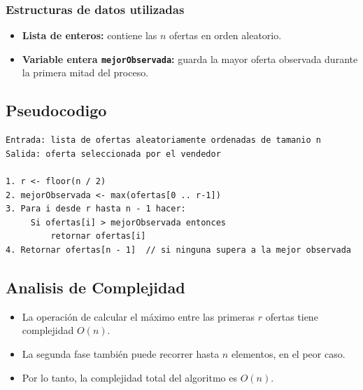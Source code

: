 \documentclass[a4paper, 12pt]{article}
\begin{document}
\subsubsection*{Estructuras de datos utilizadas}
\begin{itemize}
    \item \textbf{Lista de enteros:} contiene las $n$ ofertas en orden aleatorio.
    \item \textbf{Variable entera \texttt{mejorObservada}:} guarda la mayor oferta observada durante la primera mitad del proceso.
\end{itemize}

\subsection{Pseudocodigo}
\begin{lstlisting}[frame=single]
Entrada: lista de ofertas aleatoriamente ordenadas de tamanio n
Salida: oferta seleccionada por el vendedor

1. r <- floor(n / 2)
2. mejorObservada <- max(ofertas[0 .. r-1])
3. Para i desde r hasta n - 1 hacer:
     Si ofertas[i] > mejorObservada entonces
         retornar ofertas[i]
4. Retornar ofertas[n - 1]  // si ninguna supera a la mejor observada
\end{lstlisting}

\subsection{Analisis de Complejidad}
\begin{itemize}
    \item La operación de calcular el máximo entre las primeras $r$ ofertas tiene complejidad $O(n)$.
    \item La segunda fase también puede recorrer hasta $n$ elementos, en el peor caso.
    \item Por lo tanto, la complejidad total del algoritmo es \textbf{$O(n)$}.
\end{itemize}
\end{document}
